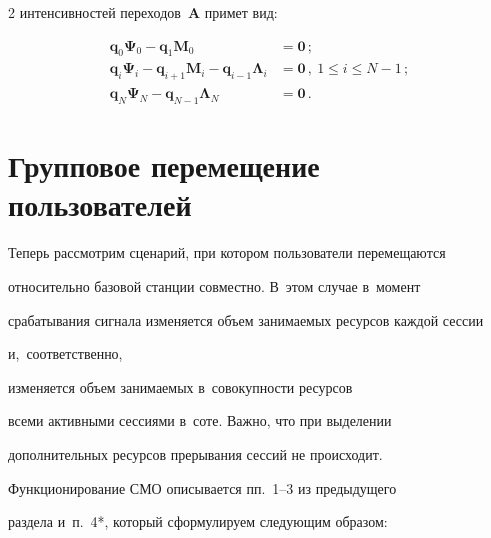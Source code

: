 \begin{multicols}{2}
интенсивностей переходов~$\mathbf{A}$ примет вид:

  \begin{align}

  \!\!\!\mathbf{q}_0\boldsymbol{\Psi}_0-\mathbf{q}_1\mathbf{M}_0&=\mathbf{0}\,; 

\label{e10-sop}\\

   \!\!\! \mathbf{q}_i\boldsymbol{\Psi}_i -\mathbf{q}_{i+1}\mathbf{M}_i- 

\mathbf{q}_{i-1}\boldsymbol{\Lambda}_i&=\mathbf{0}\,,\ 1\leq i\leq N-1\,;

  \label{e11-sop}\\

    \!\!\!\mathbf{q}_N \boldsymbol{\Psi}_N -\mathbf{q}_{N-1} 

\boldsymbol{\Lambda}_N&= \mathbf{0}\,.\label{e12-sop}

  \end{align}

  

\section{Групповое перемещение пользователей}



  Теперь рассмотрим сценарий, при котором пользователи перемещаются 

относительно базовой  станции совместно. В~этом случае в~момент 

срабатывания сигнала изменяется объем занимаемых ресурсов каждой сессии 

и,~соответственно,\linebreak\vspace*{-12pt}



\pagebreak



\noindent

 изменяется объем занимаемых в~совокупности ресурсов 

всеми активными сессиями в~соте. Важно, что при выделении 

дополнительных ресурсов прерывания сессий не происходит.

  

  Функционирование СМО описывается пп.~1--3 из предыдущего 

раздела и~п.~4*, который сформулируем следующим образом:

  \begin{itemize}


\end{itemize}
\end{multicols}
